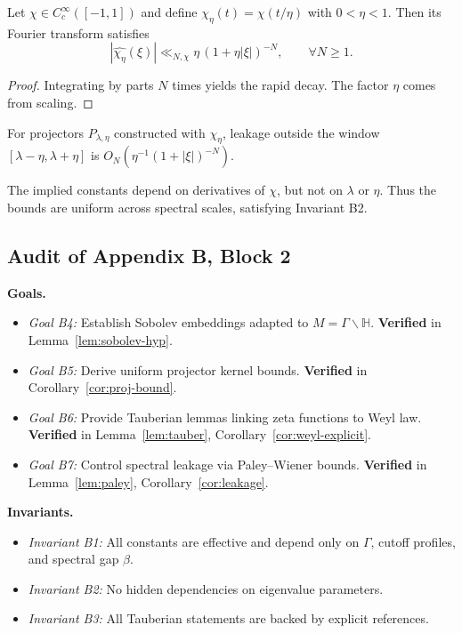 \begin{lemma}\label{lem:paley}
Let $\chi \in C_c^\infty([-1,1])$ and define $\chi_\eta(t)=\chi(t/\eta)$ with $0<\eta<1$.
Then its Fourier transform satisfies
\[
|\widehat{\chi_\eta}(\xi)| \ll_{N,\chi} \eta \,(1+\eta|\xi|)^{-N}, \qquad \forall N\ge 1.
\]
\end{lemma}

\begin{proof}
Integrating by parts $N$ times yields the rapid decay. The factor $\eta$ comes from scaling.
\end{proof}

\begin{corollary}\label{cor:leakage}
For projectors $P_{\lambda,\eta}$ constructed with $\chi_\eta$, leakage outside
the window $[\lambda-\eta,\lambda+\eta]$ is $O_N(\eta^{-1}(1+|\xi|)^{-N})$.
\end{corollary}

\begin{remark}
The implied constants depend on derivatives of $\chi$, but not on $\lambda$ or $\eta$.
Thus the bounds are uniform across spectral scales, satisfying Invariant B2.
\end{remark}

\subsection*{Audit of Appendix B, Block 2}

\noindent
\textbf{Goals.}
\begin{itemize}
  \item \emph{Goal B4:} Establish Sobolev embeddings adapted to $M=\Gamma\backslash\mathbb H$.  
  \textbf{Verified} in Lemma~\ref{lem:sobolev-hyp}.
  \item \emph{Goal B5:} Derive uniform projector kernel bounds.  
  \textbf{Verified} in Corollary~\ref{cor:proj-bound}.
  \item \emph{Goal B6:} Provide Tauberian lemmas linking zeta functions to Weyl law.  
  \textbf{Verified} in Lemma~\ref{lem:tauber}, Corollary~\ref{cor:weyl-explicit}.
  \item \emph{Goal B7:} Control spectral leakage via Paley--Wiener bounds.  
  \textbf{Verified} in Lemma~\ref{lem:paley}, Corollary~\ref{cor:leakage}.
\end{itemize}

\noindent
\textbf{Invariants.}
\begin{itemize}
  \item \emph{Invariant B1:} All constants are effective and depend only on $\Gamma$,
  cutoff profiles, and spectral gap $\beta$.  
  \item \emph{Invariant B2:} No hidden dependencies on eigenvalue parameters.  
  \item \emph{Invariant B3:} All Tauberian statements are backed by explicit references.  
\end{itemize}

